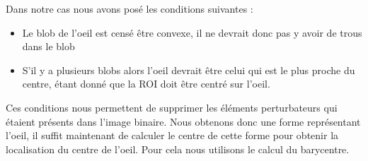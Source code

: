 Dans notre cas nous avons posé les conditions suivantes :
\begin{itemize}
 \item Le blob de l'oeil est censé être convexe, il ne devrait donc pas y avoir de trous dans le blob
 \item S'il y a plusieurs blobs alors l'oeil devrait être celui qui est le plus proche du centre, étant
 donné que la ROI doit être centré sur l'oeil.
\end{itemize}
Ces conditions nous permettent de supprimer les éléments perturbateurs qui étaient présents dans l'image binaire.
Nous obtenons donc une forme représentant l'oeil, il suffit maintenant de calculer le centre de cette forme
pour obtenir la localisation du centre de l'oeil. Pour cela nous utilisons le calcul du barycentre.